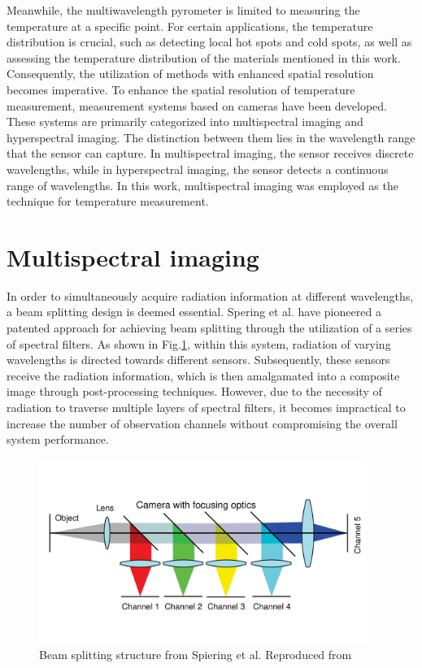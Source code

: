 Meanwhile, the multiwavelength pyrometer is limited to measuring the 
temperature at a specific point. For certain applications, 
the temperature distribution is crucial, such as detecting local hot 
spots and cold spots, as well as assessing the temperature 
distribution of the materials mentioned in this work. Consequently, the 
utilization of methods with enhanced spatial resolution becomes imperative\cite{Grujic.2023}.
To enhance the spatial resolution of temperature measurement, 
measurement systems based on cameras have been developed. 
These systems are primarily categorized into multispectral 
imaging and hyperspectral imaging. The distinction between them 
lies in the wavelength range that the sensor can capture. 
In multispectral imaging, the sensor receives discrete wavelengths, 
while in hyperspectral imaging, the sensor detects a continuous 
range of wavelengths\cite{Devesse.2017}. In this work, multispectral 
imaging was employed as the technique for temperature measurement.
%
%
\section{Multispectral imaging}%
In order to simultaneously acquire radiation information at different 
wavelengths, a beam splitting design is deemed essential. Spering et al. 
have pioneered a patented approach for achieving beam splitting 
through the utilization of a series of spectral filters\cite{Spiering.1999}. 
As shown in Fig.\ref{fig: beam_splitting}, within this system, radiation of varying wavelengths is directed towards 
different sensors. Subsequently, these sensors receive the radiation 
information, which is then amalgamated into a composite image through 
post-processing techniques. However, due to the necessity of radiation 
to traverse multiple layers of spectral filters, it becomes impractical 
to increase the number of observation channels without compromising the 
overall system performance.

\begin{figure}[p]
    \centering
    \includegraphics[width=0.95\textwidth]{figures/beam_splitting_early.pdf}
    \caption{Beam splitting structure from Spiering et al. Reproduced from \cite{Hagen.2013}}
    \label{fig: beam_splitting}
\end{figure}

